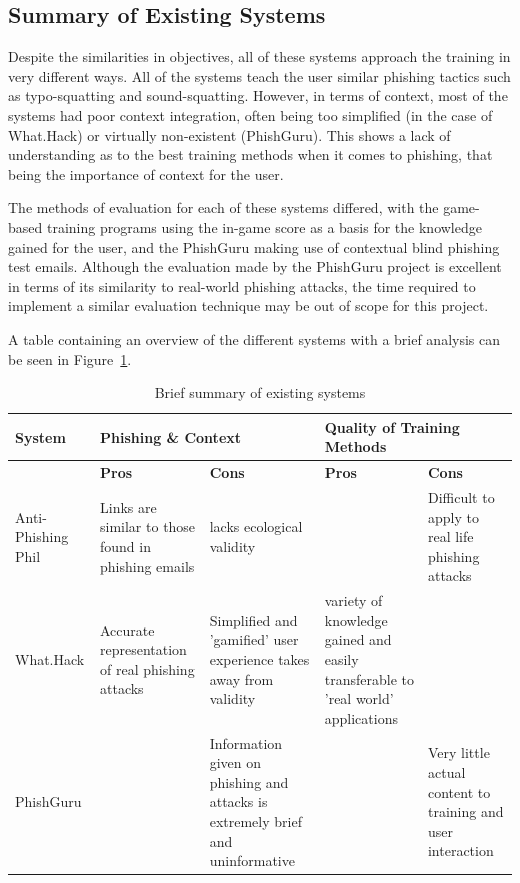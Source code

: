 \documentclass{l4proj}
\begin{document}
\subsection{Summary of Existing Systems}
Despite the similarities in objectives, all of these systems approach the training in very different ways. All of the systems teach the user similar phishing tactics such as typo-squatting and sound-squatting. However, in terms of context, most of the systems had poor context integration, often being too simplified (in the case of What.Hack) or virtually non-existent (PhishGuru). This shows a lack of understanding as to the best training methods when it comes to phishing, that being the importance of context for the user. 

The methods of evaluation for each of these systems differed, with the game-based training programs using the in-game score as a basis for the knowledge gained for the user, and the PhishGuru making use of contextual blind phishing test emails. Although the evaluation made by the PhishGuru project is excellent in terms of its similarity to real-world phishing attacks, the time required to implement a similar evaluation technique may be out of scope for this project. 

A table containing an overview of the different systems with a brief analysis can be seen in Figure~\ref{fig:sum_sys}.

\begin{table}[H]
\begin{adjustwidth}{-7em}{-5em}
\begin{tabular}{ | m{8em} | m{10em} | m{10em} | m{10em} | m{10em} | } 
 \hline
 \textbf{System} & \multicolumn{2}{l|}{\textbf{Phishing \& Context}} & \multicolumn{2}{l|}{\textbf{Quality of Training Methods}}  \\
 \hline
   & \textbf{Pros} & \textbf{Cons} & \textbf{Pros} & \textbf{Cons} \\
 \hline
  Anti-Phishing Phil & Links are similar to those found in phishing emails & lacks ecological validity  & & Difficult to apply to real life phishing attacks 
  \\
 \hline
 What.Hack & Accurate representation of real phishing attacks & Simplified and 'gamified' user experience takes away from validity & variety of knowledge gained and easily transferable to 'real world' applications & 
  \\
 \hline
 PhishGuru & & Information given on phishing and attacks is extremely brief and uninformative & & Very little actual content to training and user interaction
  \\
 \hline
\end{tabular}
\end{adjustwidth}
\caption{Brief summary of existing systems}
\label{fig:sum_sys}
\end{table}
\end{document}
